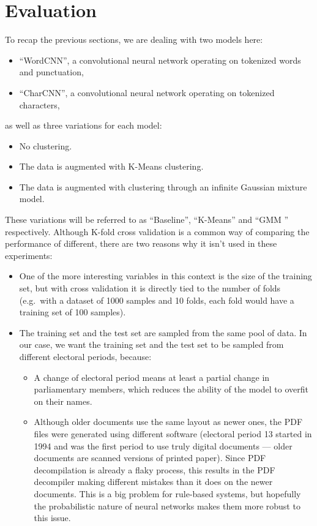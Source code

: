 \section{Evaluation}
\FloatBarrier%

To recap the previous sections, we are dealing with two models here:
\begin{itemize}
  \item ``WordCNN'', a convolutional neural network operating on tokenized words
    and punctuation,
  \item ``CharCNN'', a convolutional neural network operating on tokenized
    characters,
\end{itemize}
as well as three variations for each model:
\begin{itemize}
  \item No clustering.
  \item The data is augmented with K-Means clustering.
  \item The data is augmented with clustering through an infinite Gaussian
    mixture model.
\end{itemize}
These variations will be referred to as ``Baseline'', ``K-Means'' and ``GMM ''
respectively. Although K-fold cross validation is a common way of comparing
the performance of different, there are two reasons why it isn't used in these
experiments:
\begin{itemize}
  \item One of the more interesting variables in this context is the size of the
    training set, but with cross validation it is directly tied to the number of
    folds (e.g.\ with a dataset of 1000 samples and 10 folds, each fold
    would have a training set of 100 samples).
  \item The training set and the test set are sampled from the same pool of
    data. In our case, we want the training set and the test set to be sampled
    from different electoral periods, because:
    \begin{itemize}
      \item A change of electoral period means at least a partial change in
        parliamentary members, which reduces the ability of the model to 
        overfit on their names.
      \item Although older documents use the same layout as newer ones, the PDF
        files were generated using different software (electoral period 13 started
        in 1994 and was the first period to use truly  digital documents --- older
        documents are scanned versions of printed paper). Since PDF
        decompilation is already a flaky process, this results in the 
        PDF decompiler making different mistakes than it does on the newer
        documents. This is a big problem for rule-based systems, but hopefully the
        probabilistic nature of neural networks makes them more robust to this issue.
    \end{itemize}
\end{itemize}
